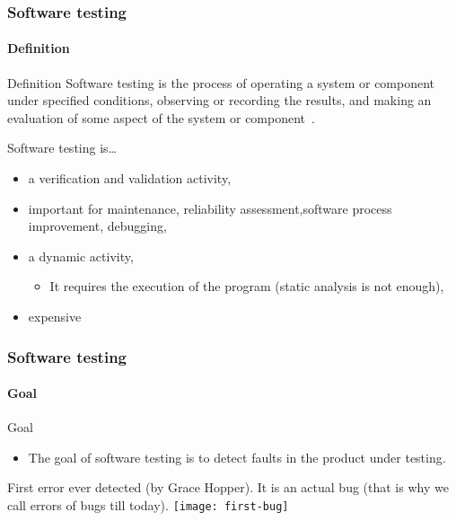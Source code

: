 \begin{frame}[hasprev=true, hasnext=true]
\frametitle{Software testing}
\framesubtitle{Definition}
\label{concept:software-testing}

\begin{block:concept}{Definition}
Software testing is the process of operating a system or component under
specified conditions, observing or recording the results, and  making
an evaluation of some aspect of the system or component~\cite{ieee610.12:1990}.
\end{block:concept}

\begin{block:fact}{Software testing is\dots{}}
\begin{itemize}
	\item a verification and validation activity,

	\item important for maintenance, reliability assessment,software process
	improvement, debugging,

	\item a dynamic activity,
	\begin{itemize}
		\item It requires the execution of the program (static analysis is
		not enough),
	\end{itemize}

	\item expensive~\cite{harrold:2000}
\end{itemize}
\end{block:fact}
\end{frame}



\begin{frame}
\frametitle{Software testing}
\framesubtitle{Goal}

\begin{block:fact}{Goal}
\begin{itemize}
	\item The goal of software testing is to detect faults in the product
	under testing.
\end{itemize}
\end{block:fact}

\begin{block:fact}{}
First error ever detected (by Grace Hopper). It is an actual bug
(that is why we call errors of bugs till today).
\centering
\texttt{[image: first-bug]}
\end{block:fact}
\end{frame}


